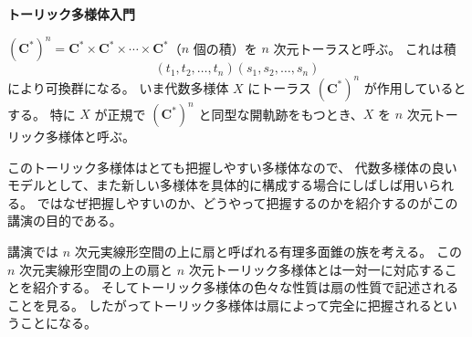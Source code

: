 \documentclass[uplatex,dvipdfmx]{jlreq}
\begin{document}
\noindent
{\large\bfseries トーリック多様体入門}

\medskip
\hspace*{\fill}{\large\bfseries 石井志保子（東工大・理）}

\bigskip\bigskip

$(\mathbf{C}^*)^n = \mathbf{C}^* \times \mathbf{C}^* \times \cdots \times \mathbf{C}^*$（$n$ 個の積）を $n$ 次元トーラスと呼ぶ。
これは積
\[
  (t_1, t_2, \ldots, t_n)(s_1, s_2, \ldots, s_n)
\]
により可換群になる。
いま代数多様体 $X$ にトーラス $(\mathbf{C}^*)^n$ が作用しているとする。
特に $X$ が正規で $(\mathbf{C}^*)^n$ と同型な開軌跡をもつとき、$X$ を $n$ 次元トーリック多様体と呼ぶ。

このトーリック多様体はとても把握しやすい多様体なので、
代数多様体の良いモデルとして、また新しい多様体を具体的に構成する場合にしばしば用いられる。
ではなぜ把握しやすいのか、どうやって把握するのかを紹介するのがこの講演の目的である。

講演では $n$ 次元実線形空間の上に扇と呼ばれる有理多面錐の族を考える。
この $n$ 次元実線形空間の上の扇と $n$ 次元トーリック多様体とは一対一に対応することを紹介する。
そしてトーリック多様体の色々な性質は扇の性質で記述されることを見る。
したがってトーリック多様体は扇によって完全に把握されるということになる。
\end{document}

